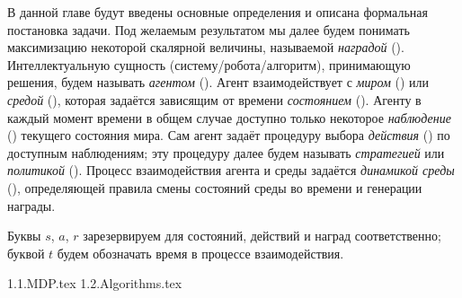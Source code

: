 В данной главе будут введены основные определения и описана формальная постановка задачи. Под желаемым результатом мы далее будем понимать максимизацию некоторой скалярной величины, называемой \emph{наградой} (). Интеллектуальную сущность (систему/робота/алгоритм), принимающую решения, будем называть \emph{агентом} (). Агент взаимодействует с \emph{миром} () или \emph{средой} (), которая задаётся зависящим от времени \emph{состоянием} (). Агенту в каждый момент времени в общем случае доступно только некоторое \emph{наблюдение} () текущего состояния мира. Сам агент задаёт процедуру выбора \emph{действия} () по доступным наблюдениям; эту процедуру далее будем называть \emph{стратегией} или \emph{политикой} (). Процесс взаимодействия агента и среды задаётся \emph{динамикой среды} (), определяющей правила смены состояний среды во времени и генерации награды.

Буквы $s$, $a$, $r$ зарезервируем для состояний, действий и наград соответственно; буквой $t$ будем обозначать время в процессе взаимодействия. 

{1.1.MDP.tex}
{1.2.Algorithms.tex}